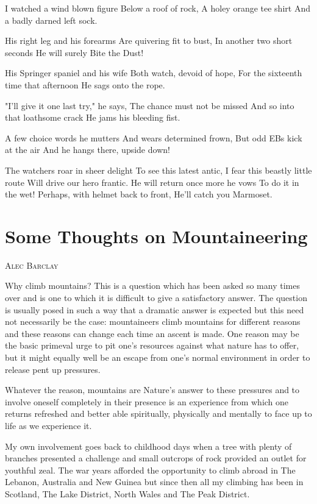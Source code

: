 \documentclass[a5paper,openany,font 10pt]{scrbook}
\makeatletter
\newcommand{\chapterauthor}[1]{%
{\parindent0pt\vspace*{-5pt}%
\linespread{1.1}\large\scshape#1%
\par\nobreak\vspace*{35pt}}
\@afterheading%
}
\makeatother
\begin{document}
I watched a wind blown figure
Below a roof of rock,
A holey orange tee shirt
And a badly darned left sock.

His right leg and his forearms
Are quivering fit to bust,
In another two short seconds
He will surely Bite the Dust!

His Springer spaniel and his wife
Both watch, devoid of hope,
For the sixteenth time that afternoon
He sags onto the rope.

"I'll give it one last try," he says,
The chance must not be missed
And so into that loathsome crack
He jams his bleeding fist.

A few choice words he mutters
And wears determined frown,
But odd EBs kick at the air
And he hangs there, upside down!

The watchers roar in sheer delight
To see this latest antic,
I fear this beastly little route
Will drive our hero frantic.
He will return once more he vows
To do it in the wet!
Perhaps, with helmet back to front,
He'll catch you Marmoset.

\chapter{Some Thoughts on Mountaineering}
\label{sec:org8acf190}
\chapterauthor{Alec Barclay}

Why climb mountains? This is a question which has been asked
so many times over and is one to which it is difficult to give a
satisfactory answer. The question is usually posed in such a way
that a dramatic answer is expected  but this need not necessarily
be the case: mountaineers climb mountains for different reasons
and these reasons can change each time an ascent is made. One
reason may be the basic primeval urge to pit one's resources
against what nature has to offer, but it might equally well be an
escape from one's normal environment in order to release pent up
pressures.

Whatever the reason, mountains are Nature's answer to these
pressures and to involve oneself completely in their presence is
an experience from which one returns refreshed and better able
spiritually, physically and mentally to face up to life as we
experience it.

My own involvement goes back to childhood days when a tree
with plenty of branches presented a challenge and  small outcrops
of rock provided an outlet for youthful zeal. The war years
afforded the opportunity to climb abroad  in The Lebanon,
Australia and New Guinea  but since then all my climbing has been
in Scotland, The Lake District, North Wales and The Peak
District.
\end{document}
